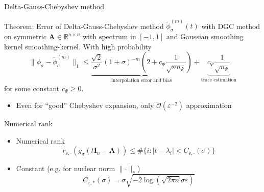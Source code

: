 \documentclass[aspectratio=169, leqno, 12pt]{beamer}
\newcommand{\mtx}[1]{\boldsymbol{#1}}
\begin{document}
\begin{frame}{Delta-Gauss-Chebyshev method}
    \begin{block}{Theorem: Error of Delta-Gauss-Chebyshev method}
        $\widetilde{\phi}_{\sigma}^{(m)}(t)$ with \gls{DGC} method
        on symmetric $\mtx{A} \in \mathbb{R}^{n \times n}$ with spectrum in $[-1, 1]$
        and Gaussian smoothing kernel \gls{smoothing-kernel}.
        With high probability
        \begin{equation}
            \lVert \phi_{\sigma} - \widetilde{\phi}_{\sigma}^{(m)}\rVert _1
            \leq \underbrace{ \frac{\sqrt{2}}{\sigma^2} (1 + \sigma)^{-m} \left( 2 + c_{\Psi} \frac{1}{\sqrt{n n_{\Psi}}} \right)}_{\text{interpolation error and bias}}
            + \underbrace{c_{\Psi} \frac{1}{\sqrt{n_{\Psi}}}}_{\text{trace estimation}}
        \end{equation}
        for some constant $c_{\Psi} \geq 0$.
    \end{block}
    \begin{itemize}
        \item Even for \enquote{good} Chebyshev expansion, only $\mathcal{O}(\varepsilon^{-2})$ approximation
    \end{itemize}
\end{frame}

\begin{frame}{Numerical rank}
            \begin{itemize}
            \item Numerical rank
            \begin{equation}
                r_{\varepsilon, \cdot}(g_{\sigma}(t\mtx{I}_n - \mtx{A})) \leq \#\{i: |t - \lambda_i| < C_{\varepsilon, \cdot}(\sigma)\}
            \end{equation}
            \item Constant (e.g. for nuclear norm $\lVert \cdot \rVert _{\ast}$)
            \begin{equation}
                C_{\varepsilon, \ast}(\sigma) = \sigma \sqrt{-2 \log(\sqrt{2 \pi n} \sigma \varepsilon)}
            \end{equation}
            \end{itemize}
    \centering
    \scalebox{1.0}{}
\end{frame}
\end{document}
